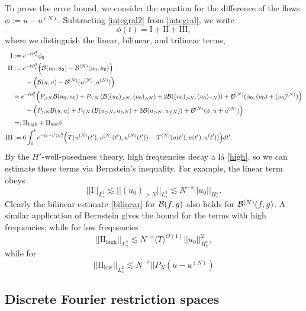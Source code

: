To prove the error bound, we consider the equation for the difference of the flows $\phi := u - u^{(N)}$. Subtracting \eqref{integral2} from \eqref{integral}, we write 
    \begin{equation}
        \phi (t)
            = \text{I} + \text{II} + \text{III}, 
    \end{equation}
where we distinguish the linear, bilinear, and trilinear terms, 
    \begin{align*}
        \text{I} 
            &:= e^{-t \partial_x^3} \phi_0 \\
        \text{II}
            &:= e^{-t \partial_x^3} \Big( \mathcal B(u_0, u_0) - \mathcal B^{(N)} (u_0, u_0) \Big) \\
            &\qquad - \Big(  \mathcal B (u, u)  -  \mathcal B^{(N)} (u^{(N)}, u^{(N)}) \Big)\\
            &=  e^{-t \partial_x^3} \Big( P_{> N} \mathcal B(u_0, u_0) + P_{\leq N}\left( \mathcal B((u_0)_{> N}, (u_0)_{> N}) + 2 \mathcal B((u_0)_{> N}, (u_0)_{\leq N})\right) + \mathcal B^{(N)} (\phi_0, (u_0) + (u_0)^{(N)})\Big)\\
            &\qquad - \Big( P_{> N} \mathcal B(u, u) + P_{\leq N}\left( \mathcal B(u_{> N}, u_{> N}) + 2 \mathcal B(u_{> N}, u_{\leq N})\right) + \mathcal B^{(N)} (\phi, u + u^{(N)}) \Big)\\
            &=: \text{II}_{\text{high}} + \text{II}_{\text{low}}\phi\\
        \text{III}
            &:=  6\int_0^t e^{-(t - t') \partial_x^3} \Big(\mathcal T (u^{(N)}(t'), u^{(N)}(t'), u^{(N)}(t')) -  \mathcal T^{(N)} (u(t'), u(t'), u^(t')) \Big) dt'.
    \end{align*}
By the $H^s$-well-posedness theory, high frequencies decay a l\'a \eqref{high}, so we can estimate these terms via Bernstein's inequality. For example, the linear term obeys
    \[
        ||\mathrm{I} ||_{L^2_x} 
            \lesssim || (u_0)_{>N}||_{L^2_x} \lesssim N^{-s} ||u_0||_{H^s_x}. 
    \]
Clearly the bilinear estimate \eqref{bilinear} for $\mathcal B(f, g)$ also holds for $\mathcal B^{(N)} (f, g)$. A similar application of Bernstein gives the bound for the terms with high frequencies, while for low frequencies 
    \[
        ||\mathrm{II}_{\text{high}}||_{L^2_x} 
            \lesssim N^{-s} \langle T \rangle^{O(1)} ||u_0||_{H^s_x}^2,
    \]
while for 
    \[
        ||\mathrm{II}_{\text{low}}||_{L^2_x}
            \lesssim N^{-s} ||P_N (u - u^(N))
    \]


\subsection{Discrete Fourier restriction spaces}

